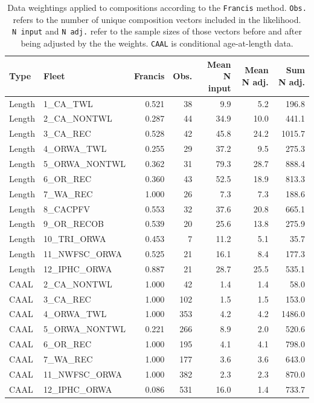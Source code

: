 \documentclass[
]{scrartcl}
\begin{document}
\begin{longtable}{llrrrrr}

\caption{\label{tbl-compweight}Data weightings applied to compositions
according to the \texttt{Francis} method. \texttt{Obs.} refers to the
number of unique composition vectors included in the likelihood.
\texttt{N\ input} and \texttt{N\ adj.} refer to the sample sizes of
those vectors before and after being adjusted by the the weights.
\texttt{CAAL} is conditional age-at-length data.}

\tabularnewline

\toprule
Type & Fleet & Francis & Obs. & Mean N input & Mean N adj. & Sum N adj. \\ 
\midrule\addlinespace[2.5pt]
Length & 1\_CA\_TWL & 0.521 & 38 & 9.9 & 5.2 & 196.8 \\ 
Length & 2\_CA\_NONTWL & 0.287 & 44 & 34.9 & 10.0 & 441.1 \\ 
Length & 3\_CA\_REC & 0.528 & 42 & 45.8 & 24.2 & 1015.7 \\ 
Length & 4\_ORWA\_TWL & 0.255 & 29 & 37.2 & 9.5 & 275.3 \\ 
Length & 5\_ORWA\_NONTWL & 0.362 & 31 & 79.3 & 28.7 & 888.4 \\ 
Length & 6\_OR\_REC & 0.360 & 43 & 52.5 & 18.9 & 813.3 \\ 
Length & 7\_WA\_REC & 1.000 & 26 & 7.3 & 7.3 & 188.6 \\ 
Length & 8\_CACPFV & 0.553 & 32 & 37.6 & 20.8 & 665.1 \\ 
Length & 9\_OR\_RECOB & 0.539 & 20 & 25.6 & 13.8 & 275.9 \\ 
Length & 10\_TRI\_ORWA & 0.453 & 7 & 11.2 & 5.1 & 35.7 \\ 
Length & 11\_NWFSC\_ORWA & 0.525 & 21 & 16.1 & 8.4 & 177.3 \\ 
Length & 12\_IPHC\_ORWA & 0.887 & 21 & 28.7 & 25.5 & 535.1 \\ 
CAAL & 2\_CA\_NONTWL & 1.000 & 42 & 1.4 & 1.4 & 58.0 \\ 
CAAL & 3\_CA\_REC & 1.000 & 102 & 1.5 & 1.5 & 153.0 \\ 
CAAL & 4\_ORWA\_TWL & 1.000 & 353 & 4.2 & 4.2 & 1486.0 \\ 
CAAL & 5\_ORWA\_NONTWL & 0.221 & 266 & 8.9 & 2.0 & 520.6 \\ 
CAAL & 6\_OR\_REC & 1.000 & 195 & 4.1 & 4.1 & 798.0 \\ 
CAAL & 7\_WA\_REC & 1.000 & 177 & 3.6 & 3.6 & 643.0 \\ 
CAAL & 11\_NWFSC\_ORWA & 1.000 & 382 & 2.3 & 2.3 & 870.0 \\ 
CAAL & 12\_IPHC\_ORWA & 0.086 & 531 & 16.0 & 1.4 & 733.7 \\ 
\bottomrule

\end{longtable}
\end{document}
